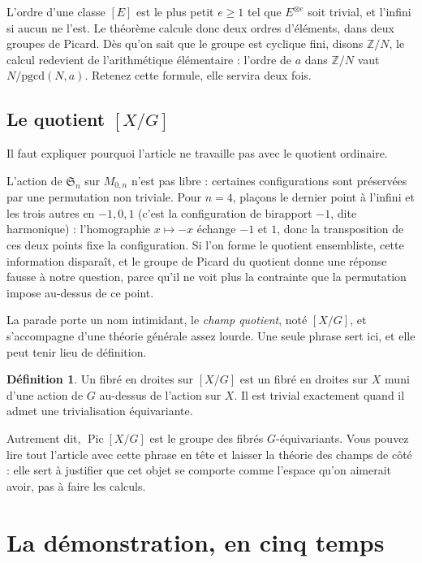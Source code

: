 \documentclass[11pt,a4paper]{amsart}
\theoremstyle{definition}
\newtheorem{definition}{Définition}
\theoremstyle{plain}
\theoremstyle{remark}
\newcommand{\M}{M_{0,n}}
\newcommand{\Sn}{\mathfrak S}
\newcommand{\Pic}{\operatorname{Pic}}
\begin{document}
L'ordre d'une classe $[E]$ est le plus petit $e \ge 1$ tel que $E^{\otimes e}$ soit trivial, et l'infini si aucun ne l'est. Le théorème calcule donc deux ordres d'éléments, dans deux groupes de Picard. Dès qu'on sait que le groupe est cyclique fini, disons $\mathbb Z/N$, le calcul redevient de l'arithmétique élémentaire : l'ordre de $a$ dans $\mathbb Z/N$ vaut $N/\mathrm{pgcd}(N,a)$. Retenez cette formule, elle servira deux fois.

\subsection{Le quotient $[X/G]$}

Il faut expliquer pourquoi l'article ne travaille pas avec le quotient ordinaire.

L'action de $\Sn_n$ sur $\M$ n'est pas libre : certaines configurations sont préservées par une permutation non triviale. Pour $n = 4$, plaçons le dernier point à l'infini et les trois autres en $-1, 0, 1$ (c'est la configuration de birapport $-1$, dite harmonique) : l'homographie $x \mapsto -x$ échange $-1$ et $1$, donc la transposition de ces deux points fixe la configuration. Si l'on forme le quotient ensembliste, cette information disparaît, et le groupe de Picard du quotient donne une réponse fausse à notre question, parce qu'il ne voit plus la contrainte que la permutation impose au-dessus de ce point.

La parade porte un nom intimidant, le \emph{champ quotient}, noté $[X/G]$, et s'accompagne d'une théorie générale assez lourde. Une seule phrase sert ici, et elle peut tenir lieu de définition.

\begin{definition}
Un fibré en droites sur $[X/G]$ est un fibré en droites sur $X$ muni d'une action de $G$ au-dessus de l'action sur $X$. Il est trivial exactement quand il admet une trivialisation équivariante.
\end{definition}

Autrement dit, $\Pic[X/G]$ est le groupe des fibrés $G$-équivariants. Vous pouvez lire tout l'article avec cette phrase en tête et laisser la théorie des champs de côté : elle sert à justifier que cet objet se comporte comme l'espace qu'on aimerait avoir, pas à faire les calculs.

\section{La démonstration, en cinq temps}
\end{document}
